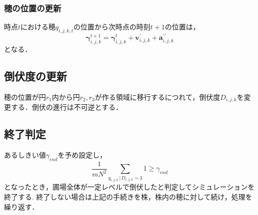 \documentclass[twocolumn]{jarticle}
\begin{document}
        \subsubsection{穂の位置の更新}
        時点$t$における穂$q_{i,j,k,t}$の位置から次時点の時刻$t+1$の位置は，
        \[   
            \mathbf{\gamma}_{i,j,k}^{t+1} = \mathbf{\gamma}_{i,j,k}^{t} + \mathbf{v}_{i,j,k}^{\prime} + \mathbf{a}^{\prime\prime}_{i,j,k}
        \]
        となる．

        \subsection{倒伏度の更新}
        穂の位置が円$r_1$内から円$r_2,r_3$が作る領域に移行するにつれて，倒伏度$D_{i,j,k}$を変更する．倒伏の進行は不可逆とする． 

        \subsection{終了判定}
        あるしきい値$\gamma_{end}$を予め設定し，\\
        \[
            \frac{1}{mN^{2}}\sum_{q_{i,j,k} \, | \, D_{i,j,k}=3}{1}\ge \gamma_{end} 
        \]
        となったとき，圃場全体が一定レベルで倒伏したと判定してシミュレーションを終了する. 
        終了しない場合は上記の手続きを株，株内の穂に対して続け，処理を繰り返す．
\end{document}
